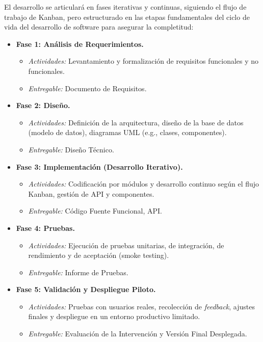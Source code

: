     El desarrollo se articulará en fases iterativas y continuas, siguiendo el flujo de trabajo de Kanban, pero estructurado en las etapas fundamentales del ciclo de vida del desarrollo de software para asegurar la completitud:
    
    \begin{itemize}
        \item \textbf{Fase 1: Análisis de Requerimientos.}
        \begin{itemize}
            \item \textit{Actividades:} Levantamiento y formalización de requisitos funcionales y no funcionales.
            \item \textit{Entregable:} Documento de Requisitos.
        \end{itemize}
        \item \textbf{Fase 2: Diseño.}
        \begin{itemize}
            \item \textit{Actividades:} Definición de la arquitectura, diseño de la base de datos (modelo de datos), diagramas UML (e.g., clases, componentes).
            \item \textit{Entregable:} Diseño Técnico.
        \end{itemize}
        \item \textbf{Fase 3: Implementación (Desarrollo Iterativo).}
        \begin{itemize}
            \item \textit{Actividades:} Codificación por módulos y desarrollo continuo según el flujo Kanban, gestión de API y componentes.
            \item \textit{Entregable:} Código Fuente Funcional, API.
        \end{itemize}
        \item \textbf{Fase 4: Pruebas.}
        \begin{itemize}
            \item \textit{Actividades:} Ejecución de pruebas unitarias, de integración, de rendimiento y de aceptación (smoke testing).
            \item \textit{Entregable:} Informe de Pruebas.
        \end{itemize}
        \item \textbf{Fase 5: Validación y Despliegue Piloto.}
        \begin{itemize}
            \item \textit{Actividades:} Pruebas con usuarios reales, recolección de \textit{feedback}, ajustes finales y despliegue en un entorno productivo limitado.
            \item \textit{Entregable:} Evaluación de la Intervención y Versión Final Desplegada.
        \end{itemize}
    \end{itemize}
    
